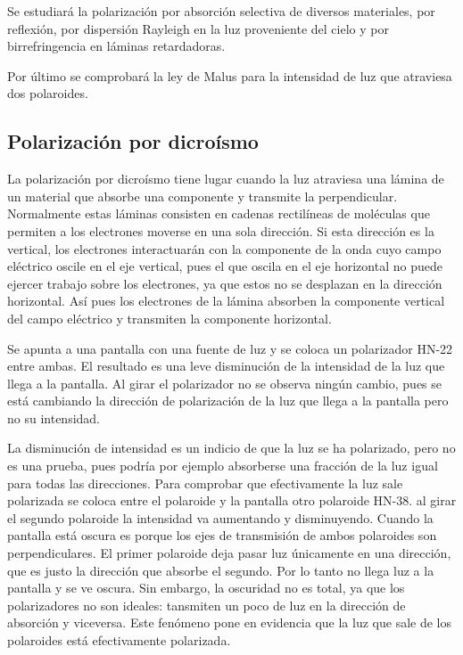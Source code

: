 \documentclass[12pt]{article}
\numberwithin{table}{section}
\numberwithin{figure}{section}
\numberwithin{equation}{section}
\begin{document}
Se estudiará la polarización por absorción selectiva de diversos materiales, por reflexión, por dispersión Rayleigh en la luz proveniente del cielo y por birrefringencia en láminas retardadoras.

Por último se comprobará la ley de Malus para la intensidad de luz que atraviesa dos polaroides.

\subsection{Polarización por dicroísmo}
La polarización por dicroísmo tiene lugar cuando la luz atraviesa una lámina de un material que absorbe una componente y transmite la perpendicular. Normalmente estas láminas consisten en cadenas rectilíneas de moléculas que permiten a los electrones moverse en una sola dirección. Si esta dirección es la vertical, los electrones interactuarán con la componente de la onda cuyo campo eléctrico oscile en el eje vertical, pues el que oscila en el eje horizontal no puede ejercer trabajo sobre los electrones, ya que estos no se desplazan en la dirección horizontal. Así pues los electrones de la lámina absorben la componente vertical del campo eléctrico y transmiten la componente horizontal.

Se apunta a una pantalla con una fuente de luz y se coloca un polarizador HN-22 entre ambas. El resultado es una leve disminución de la intensidad de la luz que llega a la pantalla. Al girar el polarizador no se observa ningún cambio, pues se está cambiando la dirección de polarización de la luz que llega a la pantalla pero no su intensidad.

La disminución de intensidad es un indicio de que la luz se ha polarizado, pero no es una prueba, pues podría por ejemplo absorberse una fracción de la luz igual para todas las direcciones. Para comprobar que efectivamente la luz sale polarizada se coloca entre el polaroide y la pantalla otro polaroide HN-38. al girar el segundo polaroide la intensidad va aumentando y disminuyendo. Cuando la pantalla está oscura es porque los ejes de transmisión de ambos polaroides son perpendiculares. El primer polaroide deja pasar luz únicamente en una dirección, que es justo la dirección que absorbe el segundo. Por lo tanto no llega luz a la pantalla y se ve oscura. Sin embargo, la oscuridad no es total, ya que los polarizadores no son ideales: tansmiten un poco de luz en la dirección de absorción y viceversa. Este fenómeno pone en evidencia que la luz que sale de los polaroides está efectivamente polarizada.
\end{document}
